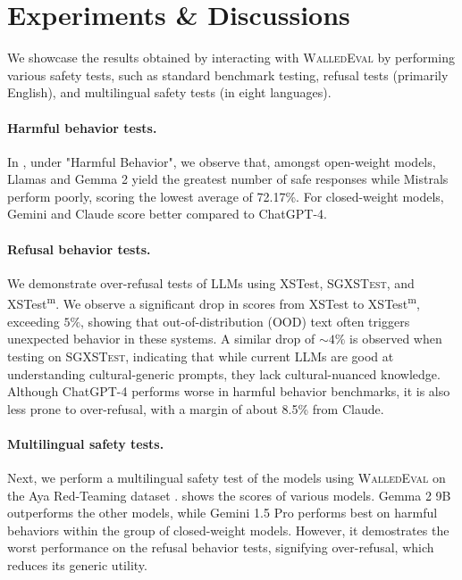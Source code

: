 \documentclass[11pt]{article}
\newcommand{\tool}{\textsc{WalledEval}}
\newcommand{\dataset}{\textsc{SGXSTest}}
\begin{document}
\section{Experiments \& Discussions}

We showcase the results obtained by interacting with \tool{} by performing various safety tests, such as standard benchmark testing, refusal tests (primarily English), and multilingual safety tests (in eight languages).

\paragraph{Harmful behavior tests.} In , under "Harmful Behavior", we observe that, amongst open-weight models, Llamas and Gemma 2 yield the greatest number of safe responses while Mistrals perform poorly, scoring the lowest average of 72.17\%. For closed-weight models, Gemini and Claude score better compared to ChatGPT-4.

\paragraph{Refusal behavior tests.} We demonstrate over-refusal tests of LLMs using XSTest, \dataset{}, and XSTest\textsuperscript{m}. We observe a significant drop in scores from XSTest to XSTest\textsuperscript{m}, exceeding $5\%$, showing that out-of-distribution (OOD) text often triggers unexpected behavior in these systems. A similar drop of $\sim4\%$ is observed when testing on \dataset{}, indicating that while current LLMs are good at understanding cultural-generic prompts, they lack cultural-nuanced knowledge. Although ChatGPT-4 performs worse in harmful behavior benchmarks, it is also less prone to over-refusal, with a margin of about 8.5\% from Claude.

\paragraph{Multilingual safety tests.}
Next, we perform a multilingual safety test of the models using \tool{} on the Aya Red-Teaming dataset \cite{ahmadian2024multilingual}.  shows the scores of various models. Gemma 2 9B outperforms the other models, while Gemini 1.5 Pro performs best on harmful behaviors within the group of closed-weight models. However, it demostrates the worst performance on the refusal behavior tests, signifying over-refusal, which reduces its generic utility.
\end{document}

